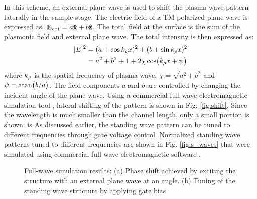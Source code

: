 \documentclass[11pt]{article}
\begin{document}
%
In this scheme, an external plane wave is used to shift the plasma wave pattern laterally in the sample stage. The electric field of a TM polarized plane wave is expressed as, $\mathbf{E}_{ext} = a \mathbf{\hat x} + b \mathbf{\hat z}$. The total field at the surface is the sum of the plasmonic field and external plane wave. The total intensity is then expressed as:
%
\begin{equation}
  \begin{split}
    \vert E \vert^2 &= (a + \cos k_{\rho}x)^2 + (b + \sin k_{\rho}x)^2 \\
    &=  a^2 + b^2 + 1 + 2 \chi \cos(k_{\rho}x + \psi)
  \end{split}
  \label{eq:shift}
\end{equation}
%
where $k_{\rho}$ is the spatial frequency of plasma wave, $\chi = \sqrt{a^2 + b^2}$ and $\psi = \atan (b/a)$. The field components $a$ and $b$ are controlled by changing the incident angle of the plane wave. Using a commercial full-wave electromagnetic simulation tool \cite{comsol}, lateral shifting of the pattern is shown in Fig. \ref{fig:shift}. Since the wavelength is much smaller than the channel length, only a small portion is shown.  is As discussed earlier, the standing wave pattern can be tuned to different frequencies through gate voltage control.
Normalized standing wave patterns tuned to different frequencies are shown in Fig. \ref{fig:s_waves} that were simulated using commercial full-wave electromagnetic software \cite{comsol}.
%
\begin{figure}[t!]
      \hfil
  \caption{Full-wave simulation results: (a) Phase shift achieved by exciting the structure with an external plane wave at an angle. (b) Tuning of the standing wave structure by applying gate bias}
  \label{fig:simulation1}
\end{figure}

\end{document}

